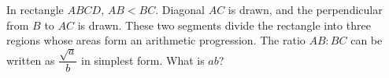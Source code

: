 In rectangle $ABCD$, $AB<BC$. Diagonal $AC$ is drawn, and the perpendicular from $B$ to $AC$ is drawn. These two segments divide the rectangle into three regions whose areas form an arithmetic progression. The ratio $AB:BC$ can be written as $\dfrac{\sqrt a}{b}$ in simplest form. What is $ab$?
